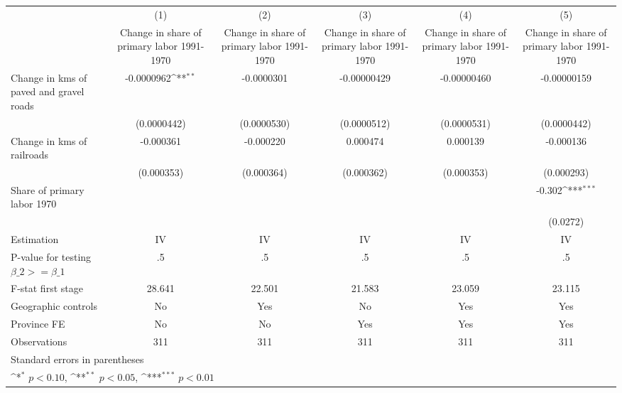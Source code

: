 {
\def\sym#1{\ifmmode^{#1}\else\(^{#1}\)\fi}
\begin{tabular}{l*{5}{c}}
\hline\hline
                    &\multicolumn{1}{c}{(1)}&\multicolumn{1}{c}{(2)}&\multicolumn{1}{c}{(3)}&\multicolumn{1}{c}{(4)}&\multicolumn{1}{c}{(5)}\\
                    &\multicolumn{1}{c}{Change in share of primary labor 1991-1970}&\multicolumn{1}{c}{Change in share of primary labor 1991-1970}&\multicolumn{1}{c}{Change in share of primary labor 1991-1970}&\multicolumn{1}{c}{Change in share of primary labor 1991-1970}&\multicolumn{1}{c}{Change in share of primary labor 1991-1970}\\
\hline
Change in kms of paved and gravel roads&  -0.0000962\sym{**} &  -0.0000301         & -0.00000429         & -0.00000460         & -0.00000159         \\
                    & (0.0000442)         & (0.0000530)         & (0.0000512)         & (0.0000531)         & (0.0000442)         \\
[1em]
Change in kms of railroads&   -0.000361         &   -0.000220         &    0.000474         &    0.000139         &   -0.000136         \\
                    &  (0.000353)         &  (0.000364)         &  (0.000362)         &  (0.000353)         &  (0.000293)         \\
[1em]
Share of primary labor 1970&                     &                     &                     &                     &      -0.302\sym{***}\\
                    &                     &                     &                     &                     &    (0.0272)         \\
\hline
Estimation          &          IV         &          IV         &          IV         &          IV         &          IV         \\
P-value for testing $\beta\_2 >= \beta\_1$&          .5         &          .5         &          .5         &          .5         &          .5         \\
F-stat first stage  &      28.641         &      22.501         &      21.583         &      23.059         &      23.115         \\
Geographic controls &          No         &         Yes         &          No         &         Yes         &         Yes         \\
Province FE         &          No         &          No         &         Yes         &         Yes         &         Yes         \\
Observations        &         311         &         311         &         311         &         311         &         311         \\
\hline\hline
\multicolumn{6}{l}{\footnotesize Standard errors in parentheses}\\
\multicolumn{6}{l}{\footnotesize \sym{*} \(p<0.10\), \sym{**} \(p<0.05\), \sym{***} \(p<0.01\)}\\
\end{tabular}
}
